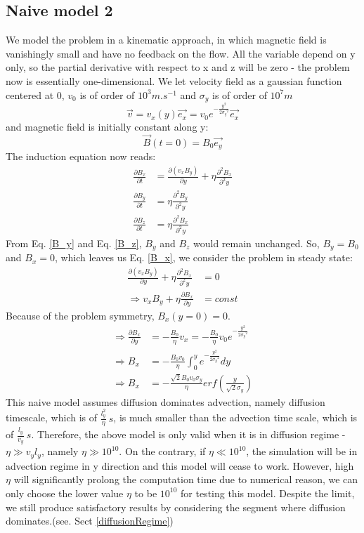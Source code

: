 \documentclass[11pt]{article}
\begin{document}
\subsection{Naive model 2 } \label{NaiveModel}
We model the problem in a kinematic approach, in which magnetic field is vanishingly small and have no feedback on the flow. All the variable depend on y only, so the partial derivative with respect to x and z will be zero - the problem now is essentially one-dimensional. We let velocity field as a gaussian function centered at 0, $v_0$ is of order of  $10^3 m.s^{-1}$ and $\sigma_y$ is of order of $10^7 m$
$$ \overrightarrow{v} = v_x(y)\overrightarrow{e_x} = v_0 e^{-\frac{y^2}{2{\sigma_y}^2}}\overrightarrow{e_x} $$ and  magnetic field is initially constant along y:   
$$\overrightarrow{B}(t=0) = B_0 \overrightarrow{e_y}$$ 
The induction equation now reads:
\begin{align}
  \frac{\partial B_x}{\partial t} &= \frac{\partial(v_x B_y)}{\partial y} + \eta{\frac{\partial^2 B_x}{\partial^2 y}} \label{B_x}\\ 
\frac{\partial B_y}{\partial t}  &=    \eta{\frac{\partial^2 B_y}{\partial^2 y}} \label{B_y} \\
\frac{\partial B_z}{\partial t}  &=  \eta{\frac{\partial^2 B_x}{\partial^2 y}} \label{B_z}
\end{align}
From Eq. \ref{B_y} and Eq. \ref{B_z}, $B_y$ and $B_z$ would remain unchanged. So, $B_y = B_0$ and $B_x = 0$, which leaves us Eq. \ref{B_x}, we consider the problem in steady state:
\begin{align}
\frac{\partial(v_x B_y)}{\partial y} + \eta{\frac{\partial^2 B_x}{\partial^2 y}} &= 0 \\
\Longrightarrow v_x B_y + \eta{\frac{\partial B_x}{\partial y}} &= const
\end{align}
Because of the problem symmetry, $B_x(y=0) = 0$.
\begin{align}
\Longrightarrow \frac{\partial B_x}{\partial y} &= -\frac{B_0}{\eta} v_x  = -\frac{B_0}{\eta}v_0 e^{-\frac{y^2}{2{\sigma_y}^2}} \\
\Longrightarrow B_x &= -\frac{B_0 v_0}{\eta} \int_0^y e^{-\frac{y^2}{2{\sigma_y}^2}} dy \\
\Longrightarrow B_x &= -\frac{\sqrt{2} B_0 v_0 \sigma_y}{\eta} erf(\frac{y}{\sqrt{2}\sigma_y}) \label{AnaBx}
\end{align}
This naive model assumes diffusion dominates advection, namely diffusion timescale, which is of $\frac{l_y^2}{\eta} \ s$,  is much smaller than the advection time scale, which is of $\frac{l_y}{v_y} \ s$. Therefore, the above model is only valid when it is in diffusion regime - $\eta \gg v_y l_y$, namely $\eta \gg 10^{10}$. On the contrary, if $\eta \ll 10^{10}$, the simulation will be in advection regime in y direction and this model will cease to work. However, high $\eta$ will significantly prolong the computation time due to numerical reason, we can only choose the lower value $\eta$ to be $10^{10}$ for testing this model. Despite the limit, we still produce satisfactory results by considering the segment where diffusion dominates.(see. Sect \ref{diffusionRegime})
\end{document}
